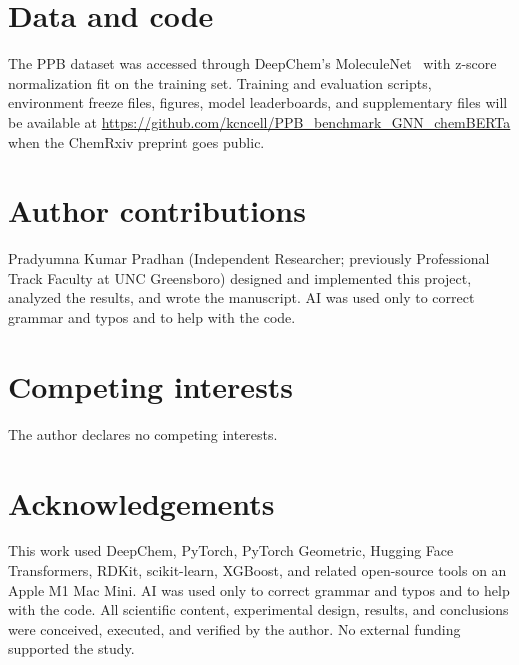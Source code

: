 \documentclass[11pt,a4paper]{article}
\begin{document}
\section*{Data and code}
The PPB dataset was accessed through DeepChem's MoleculeNet~\cite{wu2018moleculenet} with z-score normalization fit on the training set.
Training and evaluation scripts, environment freeze files, figures, model leaderboards, and supplementary files will be available at \url{https://github.com/kcncell/PPB\_benchmark\_GNN\_chemBERTa} when the ChemRxiv preprint goes public.

\section*{Author contributions}
Pradyumna Kumar Pradhan (Independent Researcher; previously Professional Track Faculty at UNC Greensboro) designed and implemented this project, analyzed the results, and wrote the manuscript.
AI was used only to correct grammar and typos and to help with the code.

\section*{Competing interests}
The author declares no competing interests.

\section*{Acknowledgements}
This work used DeepChem, PyTorch, PyTorch Geometric, Hugging Face Transformers, RDKit, scikit-learn, XGBoost, and related open-source tools on an Apple M1 Mac Mini.
AI was used only to correct grammar and typos and to help with the code.
All scientific content, experimental design, results, and conclusions were conceived, executed, and verified by the author.
No external funding supported the study.


\end{document}
